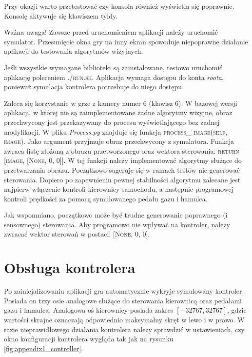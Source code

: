 Przy okazji warto przetestować czy konsola również wyświetla się poprawnie. 
Konsolę aktywuje się klawiszem tyldy.

Ważna uwaga! 
Zawsze przed uruchomieniem aplikacji należy uruchomić symulator. 
Przesunięcie okna gry na inny ekran spowoduje niepoprawne działanie aplikacji do testowania algorytmów wizyjnych.

Jeśli wszystkie wymagane biblioteki są zainstalowane, testowo uruchomić aplikację poleceniem \textsc{./run.sh}. 
Aplikacja wymaga dostępu do konta \textit{roota}, ponieważ symulacja kontrolera potrzebuje do niego dostępu. %

Zaleca się korzystanie w grze z kamery numer 6 (klawisz 6).
W bazowej wersji aplikacji, w której nie są zaimplementowane żadne algorytmy wizyjne, obraz przechwycony jest przekazywany do procesu wyświetlającego bez żadnej modyfikacji. %
W pliku \textit{Process.py} znajduje się funkcja \textsc{process\_ image(self, image)}. 
Jako argument przyjmuje obraz przechwycony z symulatora. 
Funkcja zwraca listę złożoną z obrazu przetworzonego oraz wektora sterowania: \textsc{return [image, [None, 0, 0]]}. 
W tej funkcji należy implementować algorytmy służące do przetwarzania obrazu. 
Początkowo sugeruje się w ramach testów nie generować sterowania. 
Dopiero po zapewnieniu pewnej stabilności algorytmu zalecane jest najpierw włączenie kontroli kierownicy samochodu, a następnie programowej kontroli prędkości za pomocą symulowanego pedału gazu i hamulca.

Jak wspomniano, początkowo może być trudne generowanie poprawnego (i sensownego) sterowania. 
Aby programowo nie wpływać na kontroler, należy zwracać wektor sterowań w postaci: \textsc{[None, 0, 0]}.

\section{Obsługa kontrolera}

Po zainicjalizowaniu aplikacji gra automatycznie wykryje symulowany kontroler. 
Posiada on trzy osie analogowe służące do sterowania kierownicą oraz pedałami gazu i hamulca. 
Analogowa oś kierownicy posiada zakres $[-32767, 32767]$, gdzie wartości skrajne oznaczają odpowiednio maksymalny skręt w lewo i w prawo. 
W razie nieprawidłowego działania kontrolera należy sprawdzić w ustawieniach, czy okno konfiguracji kontrolera wygląda tak jak na rysunku \ref{fig:appendix1_controller}. %

